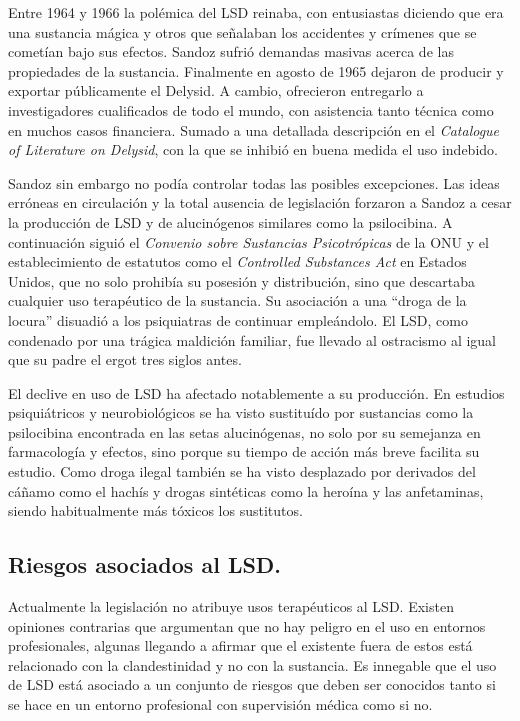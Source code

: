 Entre 1964 y 1966 la polémica del LSD reinaba, con entusiastas diciendo que era una sustancia mágica y otros que señalaban los accidentes y crímenes que se cometían bajo sus efectos. Sandoz sufrió demandas masivas acerca de las propiedades de la sustancia. Finalmente en agosto de 1965 dejaron de producir y exportar públicamente el Delysid. A cambio, ofrecieron entregarlo a investigadores cualificados de todo el mundo, con asistencia tanto técnica como en muchos casos financiera. Sumado a una detallada descripción en el \textit{Catalogue of Literature on Delysid}, con la que se inhibió en buena medida el uso indebido.

Sandoz sin embargo no podía controlar todas las posibles excepciones. Las ideas erróneas en circulación y la total ausencia de legislación forzaron a Sandoz a cesar la producción de LSD y de alucinógenos similares como la psilocibina. A continuación siguió el \textit{Convenio sobre Sustancias Psicotrópicas} de la ONU y el establecimiento de estatutos como el \textit{Controlled Substances Act} en Estados Unidos, que no solo prohibía su posesión y distribución, sino que descartaba cualquier uso terapéutico de la sustancia. Su asociación a una \enquote{droga de la locura} disuadió a los psiquiatras de continuar empleándolo. El LSD, como condenado por una trágica maldición familiar, fue llevado al ostracismo al igual que su padre el ergot tres siglos antes.

El declive en uso de LSD ha afectado notablemente a su producción. En estudios psiquiátricos y neurobiológicos se ha visto sustituído por sustancias como la psilocibina encontrada en las setas alucinógenas, no solo por su semejanza en farmacología y efectos, sino porque su tiempo de acción más breve facilita su estudio. Como droga ilegal también se ha visto desplazado por derivados del cáñamo como el hachís y drogas sintéticas como la heroína y las anfetaminas, siendo habitualmente más tóxicos los sustitutos.

\subsection{Riesgos asociados al LSD.}

Actualmente la legislación no atribuye usos terapéuticos al LSD. Existen opiniones contrarias que argumentan que no hay peligro en el uso en entornos profesionales, algunas llegando a afirmar que el existente fuera de estos está relacionado con la clandestinidad y no con la sustancia. Es innegable que el uso de LSD está asociado a un conjunto de riesgos que deben ser conocidos tanto si se hace en un entorno profesional con supervisión médica como si no.

